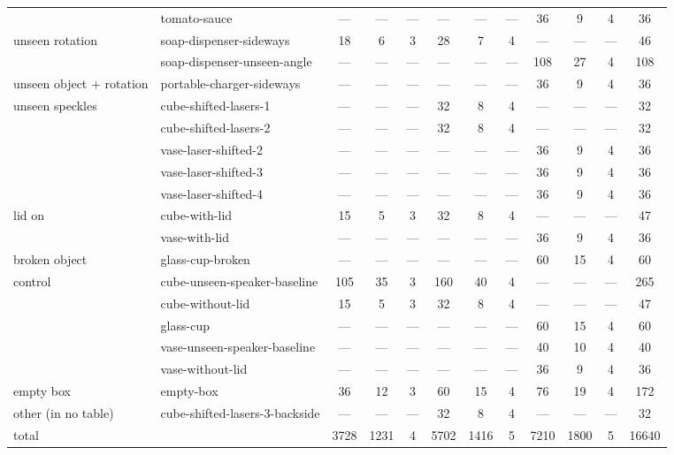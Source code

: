 \begin{table}
\begin{tabular}{ll|ccc|ccc|ccc|c}
 & tomato-sauce & — & — & — & — & — & — & 36 & 9 & 4 & 36 \\
\cline{1-12}
\multirow[t]{2}{*}{unseen rotation} & soap-dispenser-sideways & 18 & 6 & 3 & 28 & 7 & 4 & — & — & — & 46 \\
 & soap-dispenser-unseen-angle & — & — & — & — & — & — & 108 & 27 & 4 & 108 \\
\cline{1-12}
unseen object + rotation & portable-charger-sideways & — & — & — & — & — & — & 36 & 9 & 4 & 36 \\
\cline{1-12}
\multirow[t]{5}{*}{unseen speckles} & cube-shifted-lasers-1 & — & — & — & 32 & 8 & 4 & — & — & — & 32 \\
 & cube-shifted-lasers-2 & — & — & — & 32 & 8 & 4 & — & — & — & 32 \\
 & vase-laser-shifted-2 & — & — & — & — & — & — & 36 & 9 & 4 & 36 \\
 & vase-laser-shifted-3 & — & — & — & — & — & — & 36 & 9 & 4 & 36 \\
 & vase-laser-shifted-4 & — & — & — & — & — & — & 36 & 9 & 4 & 36 \\
\cline{1-12}
\multirow[t]{2}{*}{lid on} & cube-with-lid & 15 & 5 & 3 & 32 & 8 & 4 & — & — & — & 47 \\
 & vase-with-lid & — & — & — & — & — & — & 36 & 9 & 4 & 36 \\
\cline{1-12}
broken object & glass-cup-broken & — & — & — & — & — & — & 60 & 15 & 4 & 60 \\
\cline{1-12}
\multirow[t]{5}{*}{control} & cube-unseen-speaker-baseline & 105 & 35 & 3 & 160 & 40 & 4 & — & — & — & 265 \\
 & cube-without-lid & 15 & 5 & 3 & 32 & 8 & 4 & — & — & — & 47 \\
 & glass-cup & — & — & — & — & — & — & 60 & 15 & 4 & 60 \\
 & vase-unseen-speaker-baseline & — & — & — & — & — & — & 40 & 10 & 4 & 40 \\
 & vase-without-lid & — & — & — & — & — & — & 36 & 9 & 4 & 36 \\
\cline{1-12}
empty box & empty-box & 36 & 12 & 3 & 60 & 15 & 4 & 76 & 19 & 4 & 172 \\
\cline{1-12}
other (in no table) & cube-shifted-lasers-3-backside & — & — & — & 32 & 8 & 4 & — & — & — & 32 \\
\cline{1-12}
total &  & 3728 & 1231 & 4 & 5702 & 1416 & 5 & 7210 & 1800 & 5 & 16640 \\
\bottomrule
\end{tabular}
\end{table}
